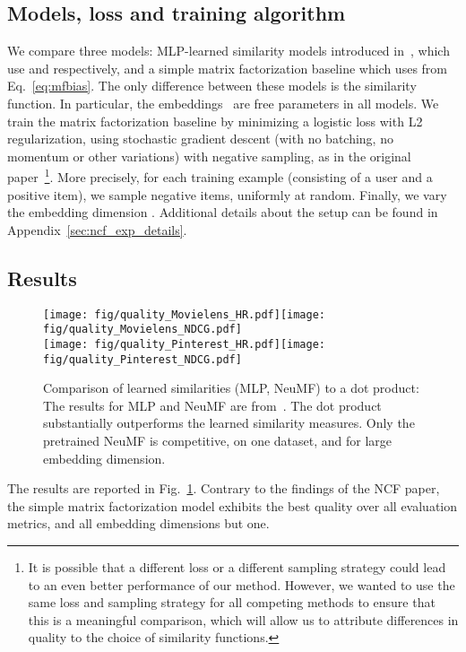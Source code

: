 \documentclass{article}
\begin{document}
\subsection{Models, loss and training algorithm}
We compare three models: MLP-learned similarity models introduced in~\cite{he:www17}, which use  and  respectively, and a simple matrix factorization baseline which uses  from Eq.~\eqref{eq:mfbias}. The only difference between these models is the similarity function. In particular, the embeddings~ are free parameters in all models.
We train the matrix factorization baseline by minimizing a logistic loss with L2 regularization, using stochastic gradient descent (with no batching, no momentum or other variations) with negative sampling, as in the original paper~\cite{he:www17}\footnote{It is possible that a different loss or a different sampling strategy could lead to an even better performance of our method. However, we wanted to use the same loss and sampling strategy for all competing methods to ensure that this is a meaningful comparison, which will allow us to attribute differences in quality to the choice of similarity functions.}.
More precisely, for each training example (consisting of a user and a positive item), we sample  negative items, uniformly at random.
Finally, we vary the embedding dimension .
Additional details about the setup can be found in Appendix~\ref{sec:ncf_exp_details}.

\subsection{Results}
\label{sec:ncf_exp}

\begin{figure}
    \centering
    \texttt{[image: fig/quality\_Movielens\_HR.pdf]}\texttt{[image: fig/quality\_Movielens\_NDCG.pdf]}\\\texttt{[image: fig/quality\_Pinterest\_HR.pdf]}\texttt{[image: fig/quality\_Pinterest\_NDCG.pdf]}\caption{Comparison of learned similarities (MLP, NeuMF) to a dot product: The results for MLP and NeuMF are from~\cite{he:www17}. The dot product substantially outperforms the learned similarity measures. Only the pretrained NeuMF is competitive, on one dataset, and for large embedding dimension.}
    \label{fig:quality}
\end{figure}

The results are reported in Fig.~\ref{fig:quality}.
Contrary to the findings of the NCF paper, the simple matrix factorization model exhibits the best quality over all evaluation metrics, and all embedding dimensions but one.
\end{document}
